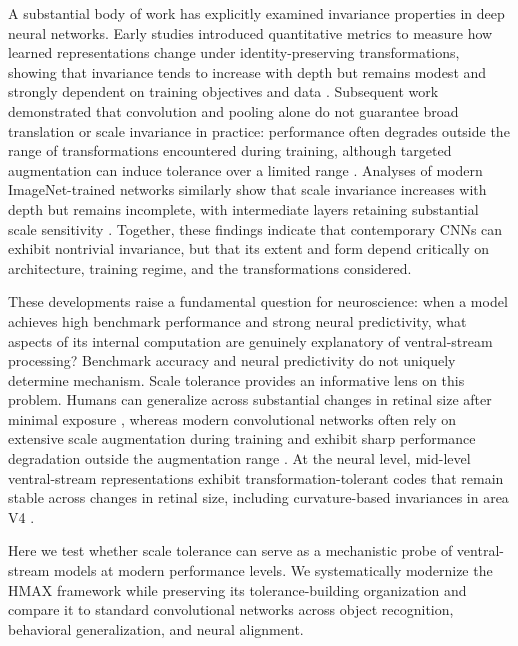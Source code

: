 \documentclass[pdflatex,sn-nature]{sn-jnl}
\begin{document}
A substantial body of work has explicitly examined invariance properties in deep neural networks. Early studies introduced quantitative metrics to measure how learned representations change under identity-preserving transformations, showing that invariance tends to increase with depth but remains modest and strongly dependent on training objectives and data \citep{Goodfellow2009}. Subsequent work demonstrated that convolution and pooling alone do not guarantee broad translation or scale invariance in practice: performance often degrades outside the range of transformations encountered during training, although targeted augmentation can induce tolerance over a limited range \citep{BiscioneBowers2021}. Analyses of modern ImageNet-trained networks similarly show that scale invariance increases with depth but remains incomplete, with intermediate layers retaining substantial scale sensitivity \citep{Graziani2021,Cui2020}. Together, these findings indicate that contemporary CNNs can exhibit nontrivial invariance, but that its extent and form depend critically on architecture, training regime, and the transformations considered.

These developments raise a fundamental question for neuroscience: when a model achieves high benchmark performance and strong neural predictivity, what aspects of its internal computation are genuinely explanatory of ventral-stream processing? Benchmark accuracy and neural predictivity do not uniquely determine mechanism. Scale tolerance provides an informative lens on this problem. Humans can generalize across substantial changes in retinal size after minimal exposure \citep{Han2020}, whereas modern convolutional networks often rely on extensive scale augmentation during training and exhibit sharp performance degradation outside the augmentation range \citep{Azulay2019why}. At the neural level, mid-level ventral-stream representations exhibit transformation-tolerant codes that remain stable across changes in retinal size, including curvature-based invariances in area V4 \citep{ElShamayleh2016Curvature}.

Here we test whether scale tolerance can serve as a mechanistic probe of ventral-stream models at modern performance levels. We systematically modernize the HMAX framework while preserving its tolerance-building organization and compare it to standard convolutional networks across object recognition, behavioral generalization, and neural alignment.


\end{document}

